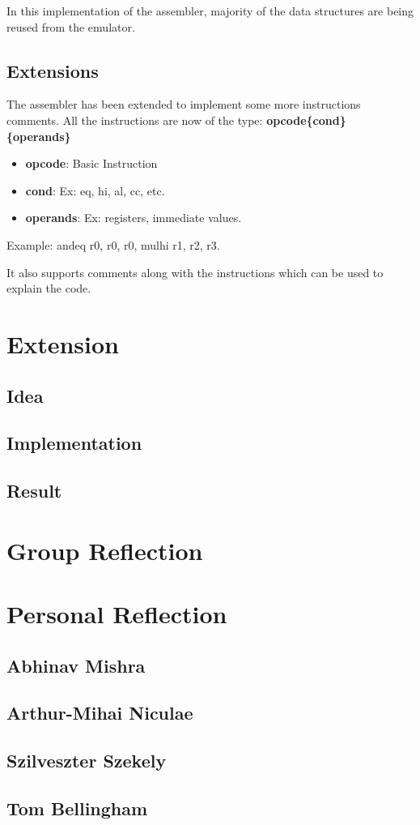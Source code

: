 \documentclass[11pt]{article}
\begin{document}
In this implementation of the assembler, majority of the data structures are
being reused from the emulator. 

\subsection{Extensions}
The assembler has been extended to implement some more instructions comments. 
All the instructions are now of the type:
\textbf{opcode\{cond\} \{operands\}}
\begin{itemize}[noitemsep,topsep=0pt]
	\item \textbf{opcode}: Basic Instruction
	\item \textbf{cond}: Ex: eq, hi, al, cc, etc.
	\item \textbf{operands}: Ex: registers, immediate values.
\end{itemize}
Example: andeq r0, r0, r0, mulhi r1, r2, r3.

It also supports comments along with the instructions which can be used to
explain the code.

\section{Extension}
\subsection{Idea}

\subsection{Implementation}

\subsection{Result}

\section{Group Reflection}

\section{Personal Reflection}
\subsection{Abhinav Mishra}

\subsection{Arthur-Mihai Niculae}

\subsection{Szilveszter Szekely}

\subsection{Tom Bellingham}
\end{document}
